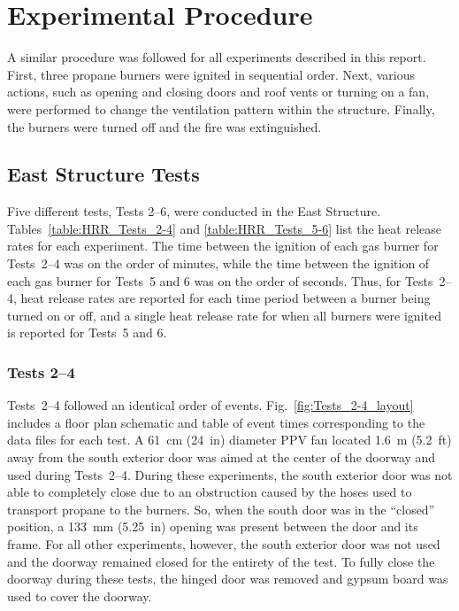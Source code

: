 \documentclass[12pt,oneside]{book}
\begin{document}
\clearpage

\chapter{Experimental Procedure}
\label{chap:Experimental_Procedure}
A similar procedure was followed for all experiments described in this report. First, three propane burners were ignited in sequential order. Next, various actions, such as opening and closing doors and roof vents or turning on a fan, were performed to change the ventilation pattern within the structure. Finally, the burners were turned off and the fire was extinguished.

\section{East Structure Tests}
\label{sec:east_procedure}
Five different tests, Tests 2--6, were conducted in the East Structure. Tables~\ref{table:HRR_Tests_2-4} and \ref{table:HRR_Tests_5-6} list the heat release rates for each experiment. The time between the ignition of each gas burner for Tests~2--4 was on the order of minutes, while the time between the ignition of each gas burner for Tests~5 and 6 was on the order of seconds. Thus, for Tests~2--4, heat release rates are reported for each time period between a burner being turned on or off, and a single heat release rate for when all burners were ignited is reported for Tests~5 and 6.

\subsection{Tests 2--4}
Tests~2--4 followed an identical order of events. Fig.~\ref{fig:Tests_2-4_layout} includes a floor plan schematic and table of event times corresponding to the data files for each test. A 61~cm (24~in) diameter PPV fan located 1.6~m (5.2~ft) away from the south exterior door was aimed at the center of the doorway and used during Tests~2--4. During these experiments, the south exterior door was not able to completely close due to an obstruction caused by the hoses used to transport propane to the burners. So, when the south door was in the ``closed'' position, a 133~mm (5.25~in) opening was present between the door and its frame. For all other experiments, however, the south exterior door was not used and the doorway remained closed for the entirety of the test. To fully close the doorway during these tests, the hinged door was removed and gypsum board was used to cover the doorway.
\end{document}
